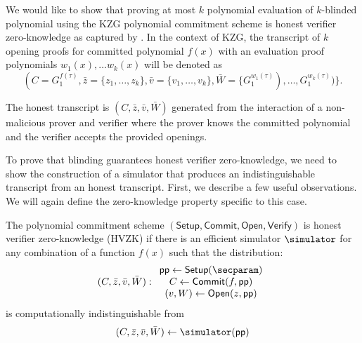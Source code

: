 
We would like to show that proving at most $k$ polynomial evaluation of $k$-blinded polynomial using the KZG polynomial commitment scheme is honest verifier zero-knowledge as captured by . In the context of KZG, the transcript of $k$ opening proofs for committed polynomial $f(x)$ with an evaluation proof polynomials $w_1(x), \ldots w_k(x)$ will be denoted as $$(C = G_1^{f(\tau)}, \bar{z} = \{z_1, \ldots, z_k\}, \bar{v} = \{v_1, \ldots, v_k\}, \bar{W} = \{G_1^{w_1(\tau)}), \ldots, G_1^{w_k(\tau)})\} .$$ 

\begin{definition}
    The honest transcript is $(C, \bar{z}, \bar{v}, \bar{W})$ generated from the interaction of a non-malicious prover and verifier where the prover knows the committed polynomial and the verifier accepts the provided openings. 
\end{definition}

To prove that blinding guarantees honest verifier zero-knowledge, we need to show the construction of a simulator that produces an indistinguishable transcript from an honest transcript. First, we describe a few useful observations. We will again define the zero-knowledge property specific to this case.

\begin{definition}
    The polynomial commitment scheme $(\mathsf{Setup}, \mathsf{Commit}, \mathsf{Open}, \mathsf{Verify})$ is honest verifier zero-knowledge (HVZK) if there is an efficient simulator $\simulator$ for any combination of a function $f(x)$ such that the distribution:
    $$(C, \bar{z}, \bar{v}, \bar{W}): 
    \begin{array}{c}
        \publicparameter \gets \mathsf{Setup}(\secparam) \\
        C \gets \mathsf{Commit}(f, \publicparameter) \\
        (v, W) \gets \mathsf{Open}(z, \publicparameter)
    \end{array}
    $$
    is computationally indistinguishable from
    $$(C, \bar{z}, \bar{v}, \bar{W}) \gets \simulator(\publicparameter)$$
\end{definition}

